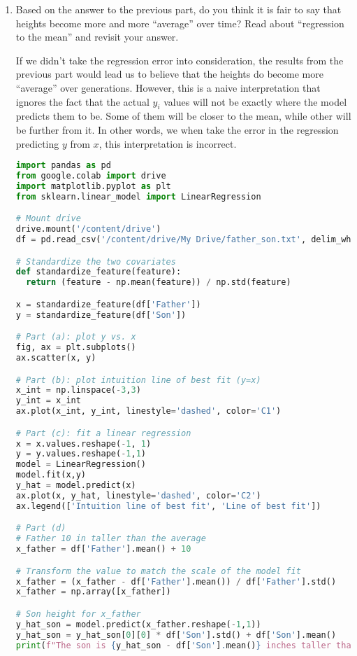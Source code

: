 \documentclass{article}
\begin{document}
\begin{enumerate}[label={(\alph*)}]
    \item Based on the answer to the previous part, do you think it is fair to say
    that heights become more and more ``average'' over time? Read about ``regression 
    to the mean'' and revisit your answer.
    
    If we didn't take the regression error into consideration, the results from the
    previous part would lead us to believe that the heights do become more ``average''
    over generations. However, this is a naive interpretation that ignores the fact
    that the actual $y_i$ values will not be exactly where the model predicts them to 
    be. Some of them will be closer to the mean, while other will be further from it.
    In other words, we when take the error in the regression predicting $y$ from $x$,
    this interpretation is incorrect.
    
    \begin{lstlisting}[language=Python, caption=Standard Error and Confidence
    Interval for $T$]
import pandas as pd
from google.colab import drive
import matplotlib.pyplot as plt
from sklearn.linear_model import LinearRegression

# Mount drive
drive.mount('/content/drive')
df = pd.read_csv('/content/drive/My Drive/father_son.txt', delim_whitespace=True)

# Standardize the two covariates
def standardize_feature(feature):
  return (feature - np.mean(feature)) / np.std(feature)

x = standardize_feature(df['Father'])
y = standardize_feature(df['Son'])

# Part (a): plot y vs. x
fig, ax = plt.subplots()
ax.scatter(x, y)

# Part (b): plot intuition line of best fit (y=x)
x_int = np.linspace(-3,3)
y_int = x_int
ax.plot(x_int, y_int, linestyle='dashed', color='C1')

# Part (c): fit a linear regression
x = x.values.reshape(-1, 1)
y = y.values.reshape(-1,1)
model = LinearRegression()
model.fit(x,y)
y_hat = model.predict(x)
ax.plot(x, y_hat, linestyle='dashed', color='C2')
ax.legend(['Intuition line of best fit', 'Line of best fit'])

# Part (d)
# Father 10 in taller than the average
x_father = df['Father'].mean() + 10

# Transform the value to match the scale of the model fit
x_father = (x_father - df['Father'].mean()) / df['Father'].std()
x_father = np.array([x_father])

# Son height for x_father
y_hat_son = model.predict(x_father.reshape(-1,1))
y_hat_son = y_hat_son[0][0] * df['Son'].std() + df['Son'].mean()
print(f"The son is {y_hat_son - df['Son'].mean()} inches taller than the average")


\end{lstlisting}
\end{enumerate}
\end{document}
